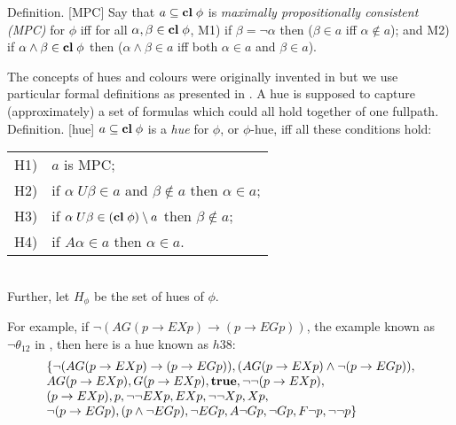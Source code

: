 \documentclass[submission,copyright,creativecommons]{eptcs}
\newcommand{\truth}{\mbox{{\bf true}}}
\newcommand{\unt}{\;{U}}
\newcommand{\tom}{{X}}
\newcommand{\fut}{F}
\newcommand{\alw}{G}
\newcommand{\pos}{{E}}
\newcommand{\nec}{{A}}
\newcommand{\clos}{\mbox{{\bf cl}}\;}
\newcommand{\huephi}{H_{\phi}}
\newenvironment{definition}{Definition. }{}
\begin{document}
\begin{definition}[MPC]
Say that $a \subseteq \clos \phi$
is {\em maximally propositionally consistent (MPC)}
for $\phi$
iff
for all $\alpha, \beta \in \clos \phi$,
M1) if $\beta= \neg \alpha$ then
($\beta \in a$ iff $\alpha \not \in a$); and M2)
if $\alpha \wedge \beta \in \clos \phi$ then
($\alpha \wedge \beta \in a$ iff
both $\alpha \in a$ and $\beta \in a$).
\end{definition}

The concepts of hues and colours
were originally invented in 
\cite{Rey:ctlstar}
but we use 
particular formal 
definitions as presented
in \cite{Rey:startabFM,Rey:startab,Rey:fasttablong}.
A hue is supposed
to 
capture (approximately) a set
of formulas
which could all hold
together of one fullpath.
\begin{definition}[hue]
$a \subseteq \clos \phi$ is a {\em hue} for $\phi$,
or $\phi$-hue, iff
all these conditions hold:\\
\begin{tabular}{ll}
H1) &
$a$ is MPC;\\
H2) & if $\alpha \unt \beta \in a$
and $\beta \not \in a$ then $\alpha \in a$;\\
H3) & if $\alpha \unt \beta \in (\clos \phi) \setminus a$
then $\beta \not \in a$;\\
H4) &
if $\nec \alpha \in a$
then $\alpha \in a$.\\
\end{tabular}\\
Further, let $\huephi$ be the set of hues of $\phi$.
\end{definition}

For example, if $\neg (\nec  \alw (p \rightarrow \pos \tom p) 
\rightarrow (p \rightarrow \pos \alw  p))$,
the example known as $\neg \theta_{12}$ in \cite{Rey:startab},
then here is a hue known as $h{38}$:
\[
\begin{array}{l} \{ 
\neg (\nec  \alw (p \rightarrow \pos \tom p) 
\rightarrow (p \rightarrow \pos \alw  p)),  
(\nec  \alw (p \rightarrow \pos \tom p) 
\wedge \neg (p \rightarrow \pos \alw  p)), \\ 
\nec  \alw (p \rightarrow \pos \tom p),  
\alw (p \rightarrow \pos \tom p ),  
\truth,  
\neg \neg  (p \rightarrow \pos \tom p ),  \\
(p \rightarrow \pos \tom p ),  
p,  
\neg \neg  \pos \tom p,  
\pos \tom p,  
\neg \neg \tom p,  
\tom p,\\  
\neg (p \rightarrow \pos \alw  p),  
(p \wedge \neg \pos \alw  p ),  
\neg  \pos \alw  p,  
\nec \neg \alw p,  
\neg \alw p,  
\fut \neg p,  
\neg \neg p
\}\\
\end{array}
\]
\end{document}
